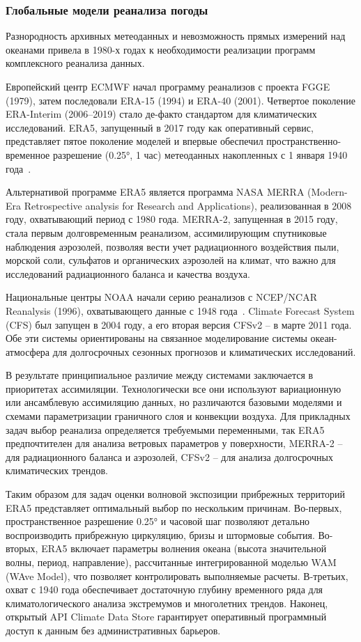 
\subsubsection{Глобальные модели реанализа погоды}
\label{sec:whether_models}

Разнородность архивных метеоданных и невозможность прямых измерений над океанами привела в 1980-х годах к необходимости реализации программ комплексного реанализа данных.

Европейский центр ECMWF начал программу реанализов с проекта FGGE (1979), затем последовали ERA-15 (1994) и ERA-40 (2001). 
Четвертое поколение ERA-Interim (2006–2019) стало де-факто стандартом для климатических исследований. 
ERA5, запущенный в 2017 году как оперативный сервис, представляет пятое поколение моделей и впервые обеспечил пространственно-временное разрешение (0.25°, 1 час) метеоданных накопленных с 1 января 1940 года~\cite{Hersbach2020ERA5}.

Альтернативой программе ERA5 является программа NASA MERRA (Modern-Era Retrospective analysis for Research and Applications), реализованная в 2008 году, охватывающий период с 1980 года. 
MERRA-2, запущенная в 2015 году, стала первым долговременным реанализом, ассимилирующим спутниковые наблюдения аэрозолей, позволяя вести учет радиационного воздействия пыли, морской соли, сульфатов и органических аэрозолей на климат, что важно для исследований радиационного баланса и качества воздуха.

Национальные центры NOAA начали серию реанализов с NCEP/NCAR Reanalysis (1996), охватывающего данные с 1948 года~\cite{saha2014ncep}. 
Climate Forecast System (CFS) был запущен в 2004 году, а его вторая версия CFSv2 -- в марте 2011 года. 
Обе эти системы ориентированы на связанное моделирование системы океан-атмосфера для долгосрочных сезонных прогнозов и климатических исследований.

В результате принципиальное различие между системами заключается в приоритетах ассимиляции. 
Технологически все они используют вариационную или ансамблевую ассимиляцию данных, но различаются базовыми моделями и схемами параметризации граничного слоя и конвекции воздуха. 
Для прикладных задач выбор реанализа определяется требуемыми переменными, так ERA5 предпочтителен для анализа ветровых параметров у поверхности, MERRA-2 -- для радиационного баланса и аэрозолей, CFSv2 -- для анализа долгосрочных климатических трендов.

Таким образом для задач оценки волновой экспозиции прибрежных территорий ERA5 представляет оптимальный выбор по нескольким причинам.
Во-первых, пространственное разрешение 0.25° и часовой шаг позволяют детально воспроизводить прибрежную циркуляцию, бризы и штормовые события.
Во-вторых, ERA5 включает параметры волнения океана (высота значительной волны, период, направление), рассчитанные интегрированной моделью WAM (WAve Model), что позволяет контролировать выполняемые расчеты. 
В-третьих, охват с 1940 года обеспечивает достаточную глубину временного ряда для климатологического анализа экстремумов и многолетних трендов. 
Наконец, открытый API Climate Data Store гарантирует оперативный программный доступ к данным без административных барьеров.

